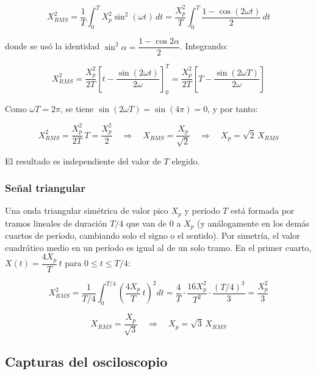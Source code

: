 \documentclass{article}
\newcommand{\capturapendiente}[3]{%
    \begin{figure}[ht!]
        \centering
        \begin{tikzpicture}[scale=0.85]
            \draw[step=1cm, gray!60, very thin] (0,0) grid (8,6);
            \draw[thick] (0,0) rectangle (8,6);
            \node[align=center, text=gray] at (4,3) {\textit{Captura pendiente}\\[2pt] \small #2};
        \end{tikzpicture}
        \caption{#1}\label{#3}
    \end{figure}%
}
\begin{document}
    \[
        X_{RMS}^2 = \frac{1}{T}\int_{0}^{T} X_p^2\sin^2(\omega t)\,dt
        = \frac{X_p^2}{T}\int_{0}^{T} \frac{1 - \cos(2\omega t)}{2}\,dt
    \]

    donde se usó la identidad $\sin^2\alpha = \dfrac{1 - \cos 2\alpha}{2}$. Integrando:

    \[
        X_{RMS}^2 = \frac{X_p^2}{2T}\left[t - \frac{\sin(2\omega t)}{2\omega}\right]_{0}^{T}
        = \frac{X_p^2}{2T}\left[T - \frac{\sin(2\omega T)}{2\omega}\right]
    \]

    Como $\omega T = 2\pi$, se tiene $\sin(2\omega T) = \sin(4\pi) = 0$, y por tanto:

    \[
        X_{RMS}^2 = \frac{X_p^2}{2T}\,T = \frac{X_p^2}{2}
        \quad\Longrightarrow\quad
        X_{RMS} = \frac{X_p}{\sqrt{2}}
        \quad\Longrightarrow\quad
        \boxed{X_p = \sqrt{2}\,X_{RMS}}
    \]

    El resultado es independiente del valor de $T$ elegido.

    \subsubsection{Señal triangular}

    Una onda triangular simétrica de valor pico $X_p$ y período $T$ está formada por tramos lineales de duración $T/4$ que van de $0$ a $X_p$ (y análogamente en los demás cuartos de período, cambiando solo el signo o el sentido). Por simetría, el valor cuadrático medio en un período es igual al de un solo tramo. En el primer cuarto, $X(t) = \dfrac{4X_p}{T}\,t$ para $0 \le t \le T/4$:

    \[
        X_{RMS}^2 = \frac{1}{T/4}\int_{0}^{T/4}\left(\frac{4X_p}{T}\,t\right)^2 dt
        = \frac{4}{T}\cdot\frac{16X_p^2}{T^2}\cdot\frac{(T/4)^3}{3}
        = \frac{X_p^2}{3}
    \]

    \[
        X_{RMS} = \frac{X_p}{\sqrt{3}}
        \quad\Longrightarrow\quad
        \boxed{X_p = \sqrt{3}\,X_{RMS}}
    \]

    \subsection{Capturas del osciloscopio}\label{anexo:capturas}

\end{document}
